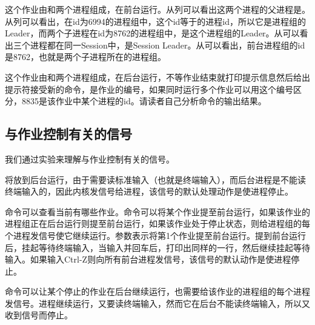 这个作业由和两个进程组成，在前台运行。从列可以看出这两个进程的父进程是。从列可以看出，在id为6994的进程组中，这个id等于的进程id，所以它是进程组的Leader，而两个子进程在id为8762的进程组中，是这个进程组的Leader。从可以看出三个进程都在同一Session中，是Session Leader。从可以看出，前台进程组的id是8762，也就是两个子进程所在的进程组。




这个作业由和两个进程组成，在后台运行，不等作业结束就打印提示信息然后给出提示符接受新的命令，\BookCode{[\BookSplit{}1]\BookSplit{}}是作业的编号，如果同时运行多个作业可以用这个编号区分，8835是该作业中某个进程的id。请读者自己分析命令的输出结果。


\subsection{与作业控制有关的信号}
%


我们通过实验来理解与作业控制有关的信号。




将放到后台运行，由于需要读标准输入（也就是终端输入），而后台进程是不能读终端输入的，因此内核发信号给进程，该信号的默认处理动作是使进程停止。




命令可以查看当前有哪些作业。命令可以将某个作业提至前台运行，如果该作业的进程组正在后台运行则提至前台运行，如果该作业处于停止状态，则给进程组的每个进程发信号使它继续运行。参数表示将第1个作业提至前台运行。提到前台运行后，挂起等待终端输入，当输入并回车后，打印出同样的一行，然后继续挂起等待输入。如果输入Ctrl-Z则向所有前台进程发信号，该信号的默认动作是使进程停止。




命令可以让某个停止的作业在后台继续运行，也需要给该作业的进程组的每个进程发信号。进程继续运行，又要读终端输入，然而它在后台不能读终端输入，所以又收到信号而停止。


